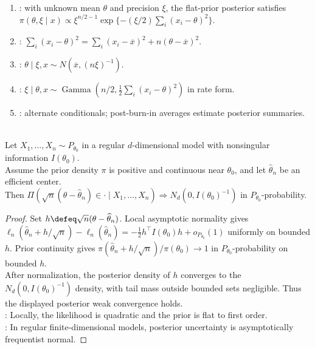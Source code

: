 \begin{method} \label{meth:gibbs-sampling-normal-mean-precision} 
\begin{enumerate}[label=(\roman*)]
\setlength{\itemsep}{0pt}
\item {}: with unknown mean $\theta$ and precision $\xi$, the flat-prior posterior satisfies\\
$\pi(\theta,\xi\mid x)\propto\xi^{n/2-1}\exp\{-(\xi/2)\sum_i(x_i-\theta)^2\}$.
\item {}: $\sum_i(x_i-\theta)^2=\sum_i(x_i-\overline{x})^2+n(\theta-\overline{x})^2$.
\item {}: $\theta\mid\xi,x\sim N(\overline{x},(n\xi)^{-1})$.
\item {}: $\xi\mid\theta,x\sim\operatorname{Gamma}(n/2,\frac12\sum_i(x_i-\theta)^2)$ in rate form.
\item {}: alternate conditionals; post-burn-in averages estimate posterior summaries.
\end{enumerate}
\end{method}

\begin{theorem} \label{thm:bernstein-von-mises-informal} \\
Let $X_1,\ldots,X_n\sim P_{\theta_0}$ in a regular $d$-dimensional model with nonsingular information $I(\theta_0)$.\\
Assume the prior density $\pi$ is positive and continuous near $\theta_0$, and let $\widehat{\theta}_n$ be an efficient center.\\
Then $\Pi(\sqrt{n}(\theta-\widehat{\theta}_n)\in\cdot\mid X_1,\ldots,X_n)\Rightarrow N_d(0,I(\theta_0)^{-1})$ in $P_{\theta_0}$-probability.
\begin{proof} Set $h\defeq\sqrt{n}(\theta-\widehat{\theta}_n)$. Local asymptotic normality gives $\ell_n(\widehat{\theta}_n+h/\sqrt{n})-\ell_n(\widehat{\theta}_n)=-\frac12h^\top I(\theta_0)h+o_{P_{\theta_0}}(1)$ uniformly on bounded $h$. Prior continuity gives $\pi(\widehat{\theta}_n+h/\sqrt{n})/\pi(\theta_0)\to1$ in $P_{\theta_0}$-probability on bounded $h$.\\
After normalization, the posterior density of $h$ converges to the $N_d(0,I(\theta_0)^{-1})$ density, with tail mass outside bounded sets negligible. Thus the displayed posterior weak convergence holds.\\
: Locally, the likelihood is quadratic and the prior is flat to first order.\\
: In regular finite-dimensional models, posterior uncertainty is asymptotically frequentist normal.
\end{proof}
\end{theorem}

